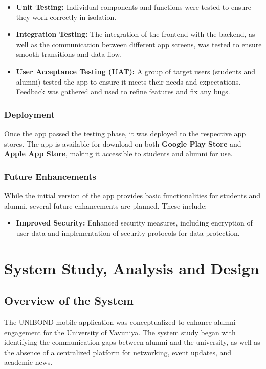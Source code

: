 \documentclass[12pt, a4paper]{report}
\begin{document}
\begin{itemize}
    \item \textbf{Unit Testing:} Individual components and functions were tested to ensure they work correctly in isolation.
    \item \textbf{Integration Testing:} The integration of the frontend with the backend, as well as the communication between different app screens, was tested to ensure smooth transitions and data flow.
    \item \textbf{User Acceptance Testing (UAT):} A group of target users (students and alumni) tested the app to ensure it meets their needs and expectations. Feedback was gathered and used to refine features and fix any bugs.
\end{itemize}

\subsection{Deployment}
Once the app passed the testing phase, it was deployed to the respective app stores. The app is available for download on both \textbf{Google Play Store} and \textbf{Apple App Store}, making it accessible to students and alumni for use.

\subsection{Future Enhancements}
While the initial version of the app provides basic functionalities for students and alumni, several future enhancements are planned. These include:

\begin{itemize}
    \item \textbf{Improved Security:} Enhanced security measures, including encryption of user data and implementation of security protocols for data protection.
\end{itemize}



\newpage

\chapter{System Study, Analysis and Design}

\section{Overview of the System}
The UNIBOND mobile application was conceptualized to enhance alumni engagement for the University of Vavuniya. The system study began with identifying the communication gaps between alumni and the university, as well as the absence of a centralized platform for networking, event updates, and academic news.
\end{document}
